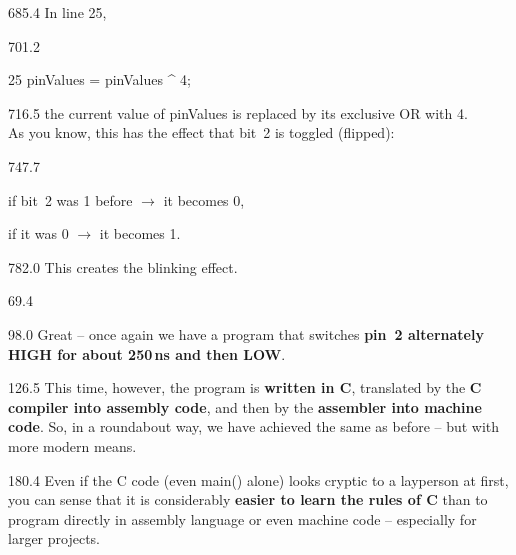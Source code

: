 \documentclass{aslab}
\makeatletter
\newcommand*\aN[1]{\textcolor{codeorange}{#1}}%
\newcommand*\aK[1]{\textcolor{codered}{#1}}%
\newenvironment{asmlisting}[1][11]{\par
  \edef\asm@bs{\the\baselineskip}\fontsize{#1bp}{\asm@bs}\selectfont
  \ttfamily\asm@setup}{\par}
\makeatother
\begin{document}
\begin{region}{685.4}
In line 25,
\end{region}

\begin{region}{701.2}
\begin{asmlisting}[9]
\aN{25}         pinValues = pinValues \textasciicircum{} \aK{4};
\end{asmlisting}
\end{region}

\begin{region}[pitch=15.5]{716.5}
the current value of pinValues is replaced by its exclusive OR with 4.\\
As you know, this has the effect that bit~2 is toggled (flipped):
\end{region}

\begin{region}[pitch=17.2]{747.7}
\begin{dashlist}
\item if bit~2 was 1 before $\rightarrow$ it becomes 0,
\item if it was 0 $\rightarrow$ it becomes 1.
\end{dashlist}
\end{region}

\begin{region}{782.0}
This creates the blinking effect.
\end{region}

\nextpage
\begin{region}{69.4}
\end{region}

\begin{region}[pitch=14.3]{98.0}
Great -- once again we have a program that switches \textbf{pin~2
alternately HIGH for about 250\,ns and then LOW}.
\end{region}

\begin{region}[pitch=13.8]{126.5}
This time, however, the program is \textbf{written in C}, translated by the
\textbf{C compiler into assembly code}, and then by the \textbf{assembler
into machine code}. So, in a roundabout way, we have achieved the same as
before -- but with more modern means.
\end{region}

\begin{region}[pitch=13.75]{180.4}
Even if the C code (even main() alone) looks cryptic to a layperson at
first, you can sense that it is considerably \textbf{easier to learn the
rules of C} than to program directly in assembly language or even machine
code -- especially for larger projects.
\end{region}
\end{document}
